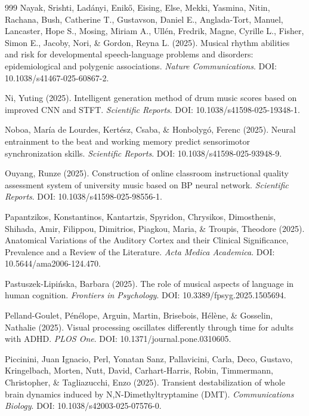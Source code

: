 \documentclass[9pt,onecolumn]{article}
\begin{document}
\begin{thebibliography}{999}
Nayak, Srishti, Ladányi, Enikő, Eising, Else, Mekki, Yasmina, Nitin, Rachana, Bush, Catherine T., Gustavson, Daniel E., Anglada-Tort, Manuel, Lancaster, Hope S., Mosing, Miriam A., Ullén, Fredrik, Magne, Cyrille L., Fisher, Simon E., Jacoby, Nori, \& Gordon, Reyna L. (2025). Musical rhythm abilities and risk for developmental speech-language problems and disorders: epidemiological and polygenic associations. \textit{Nature Communications}. DOI: 10.1038/s41467-025-60867-2.

Ni, Yuting (2025). Intelligent generation method of drum music scores based on improved CNN and STFT. \textit{Scientific Reports}. DOI: 10.1038/s41598-025-19348-1.

Noboa, María de Lourdes, Kertész, Csaba, \& Honbolygó, Ferenc (2025). Neural entrainment to the beat and working memory predict sensorimotor synchronization skills. \textit{Scientific Reports}. DOI: 10.1038/s41598-025-93948-9.

Ouyang, Runze (2025). Construction of online classroom instructional quality assessment system of university music based on BP neural network. \textit{Scientific Reports}. DOI: 10.1038/s41598-025-98556-1.

Papantzikos, Konstantinos, Kantartzis, Spyridon, Chrysikos, Dimosthenis, Shihada, Amir, Filippou, Dimitrios, Piagkou, Maria, \& Troupis, Theodore (2025). Anatomical Variations of the Auditory Cortex and their Clinical Significance, Prevalence and a Review of the Literature. \textit{Acta Medica Academica}. DOI: 10.5644/ama2006-124.470.

Pastuszek-Lipińska, Barbara (2025). The role of musical aspects of language in human cognition. \textit{Frontiers in Psychology}. DOI: 10.3389/fpsyg.2025.1505694.

Pelland-Goulet, Pénélope, Arguin, Martin, Brisebois, Hélène, \& Gosselin, Nathalie (2025). Visual processing oscillates differently through time for adults with ADHD. \textit{PLOS One}. DOI: 10.1371/journal.pone.0310605.

Piccinini, Juan Ignacio, Perl, Yonatan Sanz, Pallavicini, Carla, Deco, Gustavo, Kringelbach, Morten, Nutt, David, Carhart-Harris, Robin, Timmermann, Christopher, \& Tagliazucchi, Enzo (2025). Transient destabilization of whole brain dynamics induced by N,N-Dimethyltryptamine (DMT). \textit{Communications Biology}. DOI: 10.1038/s42003-025-07576-0.


\end{thebibliography}
\end{document}
